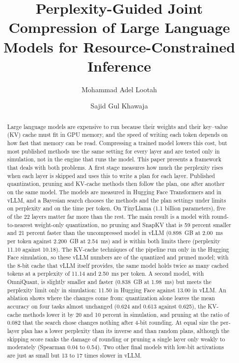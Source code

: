 \documentclass[num-refs]{wiley-article}
\title{Perplexity-Guided Joint Compression of Large Language Models for Resource-Constrained Inference}
\author[1]{Mohammad Adel Lootah}
\author[1\authfn{1}]{Sajid Gul Khawaja}
\affil[1]{College of Engineering, Abu Dhabi University, Abu Dhabi, United Arab Emirates}
\begin{document}
\maketitle

\begin{abstract}
Large language models are expensive to run because their weights and their key--value (KV) cache must fit in GPU memory, and the speed of writing each token depends on how fast that memory can be read. Compressing a trained model lowers this cost, but most published methods use the same setting for every layer and are tested only in simulation, not in the engine that runs the model. This paper presents a framework that deals with both problems. A first stage measures how much the perplexity rises when each layer is skipped and uses this to write a plan for each layer. Published quantization, pruning and KV-cache methods then follow the plan, one after another on the same model. The models are measured in Hugging Face Transformers and in vLLM, and a Bayesian search chooses the methods and the plan settings under limits on perplexity and on the time per token. On TinyLlama (1.1 billion parameters), five of the 22 layers matter far more than the rest. The main result is a model with round-to-nearest weight-only quantization, no pruning and SnapKV that is 59 percent smaller and 21 percent faster than the uncompressed model in vLLM (0.898~GB at 2.00~ms per token against 2.200~GB at 2.54~ms) and is within both limits there (perplexity 11.10 against 10.18). The KV-cache techniques of the pipeline run only in the Hugging Face simulation, so these vLLM numbers are of the quantized and pruned model; with the 8-bit cache that vLLM itself provides, the same model holds twice as many cached tokens at a perplexity of 11.14 and 2.50~ms per token. A second model, with OmniQuant, is slightly smaller and faster (0.838~GB at 1.98~ms) but meets the perplexity limit only in simulation: 11.50 in Hugging Face against 13.00 in vLLM. An ablation shows where the changes come from: quantization alone leaves the mean accuracy on four tasks almost unchanged (0.624 and 0.613 against 0.625), the KV-cache methods lower it by 20 and 10 percent in simulation, and pruning at the ratio of 0.082 that the search chose changes nothing after 4-bit rounding. At equal size the per-layer plan has a lower perplexity than its inverse and than random plans, although the skipping score ranks the damage of rounding or pruning a single layer only weakly to moderately (Spearman 0.04 to 0.54). Two other final models with low-bit activations are just as small but 13 to 17 times slower in vLLM.

\end{abstract}
\end{document}
